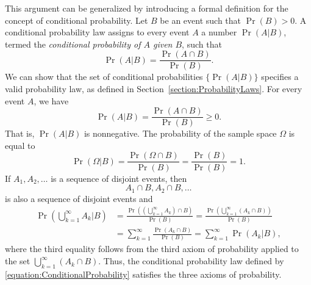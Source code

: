 This argument can be generalized by introducing a formal definition for the concept of conditional probability.
Let $B$ be an event such that $\Pr (B) > 0$.
A conditional probability law assigns to every event $A$ a number $\Pr (A|B)$, termed the \emph{conditional probability of $A$ given $B$}, such that
\begin{equation} \label{equation:ConditionalProbability}
\Pr (A | B) = \frac{\Pr (A \cap B)}{\Pr (B)}.
\end{equation}
We can show that the set of conditional probabilities $\{ \Pr (A | B) \}$ specifies a valid probability law, as defined in Section~\ref{section:ProbabilityLaws}.
For every event $A$, we have
\begin{equation*}
\Pr (A|B) = \frac{\Pr (A \cap B)}{\Pr (B)} \geq 0.
\end{equation*}
That is, $\Pr (A|B)$ is nonnegative.
The probability of the sample space $\Omega$ is equal to
\begin{equation*}
\Pr (\Omega | B) = \frac{\Pr (\Omega \cap B)}{\Pr (B)}
= \frac{\Pr (B)}{\Pr (B)} = 1 .
\end{equation*}
If $A_1, A_2, \ldots$ is a sequence of disjoint events, then
\begin{equation*}
A_1 \cap B, A_2 \cap B, \ldots
\end{equation*}
is also a sequence of disjoint events and
\begin{equation*}
\begin{split}
\Pr \left( \bigcup_{k=1}^{\infty} A_k \Big| B \right)
&= \frac{\Pr \left( \left( \bigcup_{k=1}^{\infty} A_k \right) \cap B \right)}{\Pr (B)}
= \frac{\Pr \left( \bigcup_{k=1}^{\infty} (A_k \cap B ) \right)}{\Pr (B)} \\
&= \sum_{k = 1}^{\infty} \frac{ \Pr (A_k \cap B ) }{\Pr (B)}
= \sum_{k = 1}^{\infty} \Pr (A_k | B) ,
\end{split}
\end{equation*}
where the third equality follows from the third axiom of probability applied to the set $\bigcup_{k=1}^{\infty} (A_k \cap B )$.
Thus, the conditional probability law defined by \eqref{equation:ConditionalProbability} satisfies the three axioms of probability.

